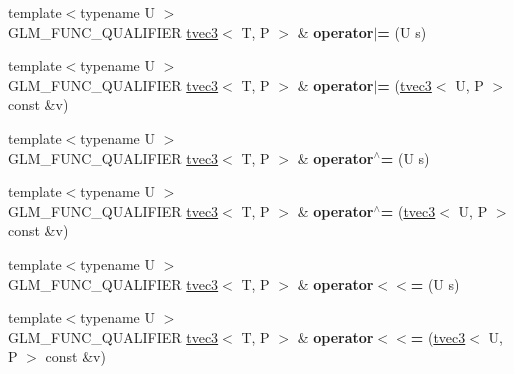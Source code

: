 \begin{DoxyCompactItemize}
\item 
{\footnotesize template$<$typename U $>$ }\\G\+L\+M\+\_\+\+F\+U\+N\+C\+\_\+\+Q\+U\+A\+L\+I\+F\+I\+ER \hyperlink{structglm_1_1detail_1_1tvec3}{tvec3}$<$ T, P $>$ \& {\bfseries operator$\vert$=} (U s)\hypertarget{structglm_1_1detail_1_1tvec3_a019d5be6cb44504bcb2b91cedff0aed9}{}\label{structglm_1_1detail_1_1tvec3_a019d5be6cb44504bcb2b91cedff0aed9}

\item 
{\footnotesize template$<$typename U $>$ }\\G\+L\+M\+\_\+\+F\+U\+N\+C\+\_\+\+Q\+U\+A\+L\+I\+F\+I\+ER \hyperlink{structglm_1_1detail_1_1tvec3}{tvec3}$<$ T, P $>$ \& {\bfseries operator$\vert$=} (\hyperlink{structglm_1_1detail_1_1tvec3}{tvec3}$<$ U, P $>$ const \&v)\hypertarget{structglm_1_1detail_1_1tvec3_a059fd49c5bed06205e0703683cbaf3e0}{}\label{structglm_1_1detail_1_1tvec3_a059fd49c5bed06205e0703683cbaf3e0}

\item 
{\footnotesize template$<$typename U $>$ }\\G\+L\+M\+\_\+\+F\+U\+N\+C\+\_\+\+Q\+U\+A\+L\+I\+F\+I\+ER \hyperlink{structglm_1_1detail_1_1tvec3}{tvec3}$<$ T, P $>$ \& {\bfseries operator$^\wedge$=} (U s)\hypertarget{structglm_1_1detail_1_1tvec3_a20e0ed2f3f08cc1028badb8b550ec746}{}\label{structglm_1_1detail_1_1tvec3_a20e0ed2f3f08cc1028badb8b550ec746}

\item 
{\footnotesize template$<$typename U $>$ }\\G\+L\+M\+\_\+\+F\+U\+N\+C\+\_\+\+Q\+U\+A\+L\+I\+F\+I\+ER \hyperlink{structglm_1_1detail_1_1tvec3}{tvec3}$<$ T, P $>$ \& {\bfseries operator$^\wedge$=} (\hyperlink{structglm_1_1detail_1_1tvec3}{tvec3}$<$ U, P $>$ const \&v)\hypertarget{structglm_1_1detail_1_1tvec3_afda445ba27ed5ca10a39b94b8e764fcb}{}\label{structglm_1_1detail_1_1tvec3_afda445ba27ed5ca10a39b94b8e764fcb}

\item 
{\footnotesize template$<$typename U $>$ }\\G\+L\+M\+\_\+\+F\+U\+N\+C\+\_\+\+Q\+U\+A\+L\+I\+F\+I\+ER \hyperlink{structglm_1_1detail_1_1tvec3}{tvec3}$<$ T, P $>$ \& {\bfseries operator$<$$<$=} (U s)\hypertarget{structglm_1_1detail_1_1tvec3_adf6a5496bcd1b0ece06a76b27117a134}{}\label{structglm_1_1detail_1_1tvec3_adf6a5496bcd1b0ece06a76b27117a134}

\item 
{\footnotesize template$<$typename U $>$ }\\G\+L\+M\+\_\+\+F\+U\+N\+C\+\_\+\+Q\+U\+A\+L\+I\+F\+I\+ER \hyperlink{structglm_1_1detail_1_1tvec3}{tvec3}$<$ T, P $>$ \& {\bfseries operator$<$$<$=} (\hyperlink{structglm_1_1detail_1_1tvec3}{tvec3}$<$ U, P $>$ const \&v)\hypertarget{structglm_1_1detail_1_1tvec3_aabbf88378ef21973abac8cdacd0b4117}{}\label{structglm_1_1detail_1_1tvec3_aabbf88378ef21973abac8cdacd0b4117}


\end{DoxyCompactItemize}
